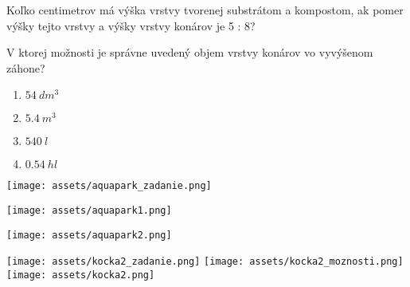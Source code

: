 \begin{example}
Koľko centimetrov má výška vrstvy tvorenej substrátom a kompostom, ak pomer výšky tejto
vrstvy a výšky vrstvy konárov je 5 : 8? 
\end{example}

\begin{example}
	V ktorej možnosti je správne uvedený objem vrstvy konárov vo vyvýšenom záhone?
	
	\begin{enumerate}
		\item $54 ~ dm^3$
		\item $5.4 ~ m^3$
		\item $540 ~ l$
		\item $0.54 ~ hl$
	\end{enumerate}
\end{example}

\begin{center}
	\texttt{[image: assets/aquapark\_zadanie.png]}
\end{center}

\begin{example}
	\begin{center}
		\texttt{[image: assets/aquapark1.png]}
	\end{center}
\end{example}

\begin{example}
	\begin{center}
		\texttt{[image: assets/aquapark2.png]}
	\end{center}
\end{example}

\begin{example}
	\begin{center}
		\texttt{[image: assets/kocka2\_zadanie.png]}
		\texttt{[image: assets/kocka2\_moznosti.png]}
		\texttt{[image: assets/kocka2.png]}
	\end{center}
\end{example}



